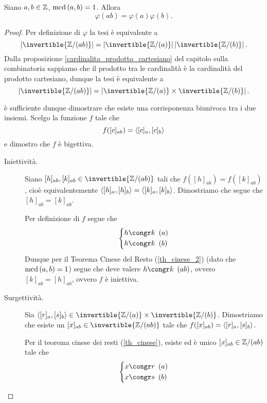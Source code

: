 \begin{proposition}
    Siano $a, b \in \mathbb{Z}$, $\operatorname{mcd}\left(a, b\right) = 1$. Allora \begin{equation}
        \varphi(ab) = \varphi(a)\varphi(b).
    \end{equation}
\end{proposition}
\begin{proof}
    Per definizione di $\varphi$ la tesi è equivalente a \[
        \abs{\invertible{\Z/(ab)}} = \abs{\invertible{\Z/(a)}}\abs{\invertible{\Z/(b)}}.
    \]
    Dalla proposizione \ref{cardinalita_prodotto_cartesiano} del capitolo sulla combinatoria sappiamo che il prodotto tra le cardinalità è la cardinalità del prodotto cartesiano, dunque la tesi è equivalente a \[
        \abs{\invertible{\Z/(ab)}} = \abs{\invertible{\Z/(a)}\times\invertible{\Z/(b)}}.
    \]

    è sufficiente dunque dimostrare che esiste una corrisponenza biunivoca tra i due insiemi. Scelgo la funzione $f$ tale che \[
        f([c]_{ab}) = \left\langle [c]_a, [c]_b \right\rangle    
    \] e dimostro che $f$ è bigettiva.

    \begin{description}
        \item[Iniettività.] Siano $[h]_{ab}, [k]_{ab} \in \invertible{\Z/(ab)}$ tali che $f([h]_{ab}) = f([k]_{ab})$, cioè equivalentemente $\left\langle [h]_a, [h]_b \right\rangle = \left\langle [k]_a, [k]_b \right\rangle$. Dimostriamo che segue che $[h]_{ab} = [k]_{ab}$.
        
        Per definizione di $f$ segue che \[
            \left\{
            \begin{alignedat}{1}
                &h \congr k \Mod{a}\\
                &h \congr k \Mod{b}
            \end{alignedat}
            \right.   
        \] Dunque per il Teorema Cinese del Resto (\ref{th_cinese_2}) (dato che $\operatorname{mcd}\left(a, b\right) = 1$) segue che deve valere $h \congr k \Mod{ab}$, ovvero $[k]_{ab} = [h]_{ab}$, ovvero $f$ è iniettiva.
        \item[Surgettività.] Sia $\ang{[r]_a, [s]_b} \in \invertible{\Z/(a)}\times\invertible{\Z/(b)}$. Dimostriamo che esiste un $[x]_{ab} \in \invertible{\Z/(ab)}$ tale che $f([x]_{ab}) = \left\langle [r]_a, [s]_b \right\rangle$.
        
        Per il teorema cinese dei resti (\ref{th_cinese}), esiste ed è unico $[x]_{ab} \in \mathbb{Z}/(ab)$ tale che \[
            \left\{
            \begin{alignedat}{1}
                &x \congr r \Mod{a}\\
                &x \congr s \Mod{b}
            \end{alignedat}
            \right.   
        \] 
        

\end{description}
\end{proof}
